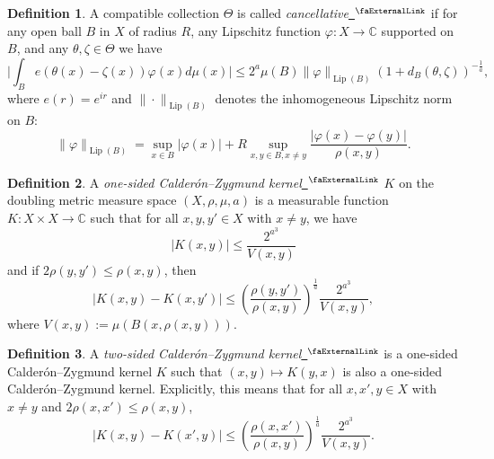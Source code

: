 \documentclass[12pt, reqno]{amsart}
\newcommand*{\complex}{\mathbb{C}} %
\newcommand{\extlink}{~\ensuremath{{}^\text{\faExternalLink}}}
\theoremstyle{definition}
\newtheorem{definition}{Definition}[section]
\theoremstyle{plain}
\DeclareMathOperator{\Lip}{\operatorname{Lip}}
\newcommand{\mfa}{{\theta}}
\newcommand{\mfb}{{\zeta}}
\newcommand{\Mf}{{\Theta}}
\begin{document}
\begin{definition}
A compatible collection $\Mf$ is called \emph{cancellative}\href{https://github.com/fpvandoorn/carleson/blob/AFM-frozen/Carleson/Defs.lean#L191-L197}{\extlink} if
for any open ball $B$ in $X$ of radius $R$, any Lipschitz function $\varphi\colon X\to \complex$
supported on $B$, and any $\mfa,\mfb\in \Mf$ we have
\begin{equation*}
	\Big|\int_B e(\mfa(x)-{\mfb(x)}) \varphi(x) d\mu(x)\Big|\le 2^a \mu(B)\|\varphi\|_{\Lip(B)}
	(1+d_B(\mfa,\mfb))^{-\frac{1}{a}},
\end{equation*}
where $e(r) = e^{ir}$ and $\|\cdot\|_{\Lip(B)}$ denotes the inhomogeneous Lipschitz norm on $B$:
$$
\|\varphi\|_{\Lip(B)} = \sup_{x \in B} |\varphi(x)| + R \sup_{x,y \in B, x \neq y} \frac{|\varphi(x) - \varphi(y)|}{\rho(x,y)}.
$$
\end{definition}

\begin{definition}\label{def:one-sided-kernel}
A \emph{one-sided Calderón--Zygmund kernel}\href{https://github.com/fpvandoorn/carleson/blob/AFM-frozen/Carleson/Defs.lean#L250-L254}{\extlink} $K$ on the doubling metric measure space $(X, \rho, \mu, a)$
is a measurable function $K:X\times X\to \mathbb{C}$ such that for all $x,y,y'\in X$ with $x\neq y$, we have
\begin{equation*}
	|K(x,y)| \leq \frac{2^{a^3}}{V(x,y)}
\end{equation*}
and if $2\rho(y,y') \leq \rho(x,y)$, then
\begin{equation*}
	|K(x,y) - K(x,y')| \leq \left(\frac{\rho(y,y')}{\rho(x,y)}\right)^{\frac{1}{a}}\frac{2^{a^3}}{V(x,y)},
\end{equation*}
where $V(x,y):=\mu(B(x,\rho(x,y)))$.
\end{definition}

\begin{definition}\label{def:two-sided-kernel}
A \emph{two-sided Calderón--Zygmund kernel}\href{https://github.com/fpvandoorn/carleson/blob/AFM-frozen/Carleson/TwoSidedCarleson/WeakCalderonZygmund.lean#L17-L20}{\extlink} is a one-sided Calderón--Zygmund kernel $K$ such that $(x,y)\mapsto K(y,x)$ is also a one-sided Calderón--Zygmund kernel. Explicitly, this means that for all $x,x',y\in X$ with $x\neq y$ and $2\rho(x,x') \leq \rho(x,y)$,
\begin{equation*}
	|K(x,y) - K(x',y)| \leq \left(\frac{\rho(x,x')}{\rho(x,y)}\right)^{\frac{1}{a}}\frac{2^{a^3}}{V(x,y)}.
\end{equation*}
\end{definition}
\end{document}
